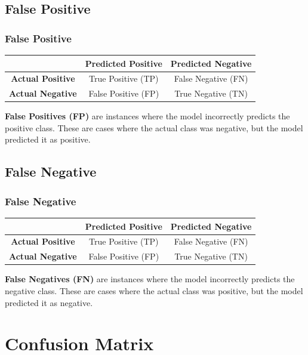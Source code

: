 \documentclass[aspectratio=169]{beamer} %
\begin{document}
	\subsection{False Positive}
	\begin{frame}
		\frametitle{False Positive}
		\begin{center}
			\begin{tabular}{|c|c|c|}
				\hline
				& \textbf{Predicted Positive} & \textbf{Predicted Negative} \\
				\hline
				\textbf{Actual Positive} & True Positive (TP) & False Negative (FN) \\
				\hline
				\textbf{Actual Negative} & {\color{blue}False Positive (FP)} & True Negative (TN) \\
				\hline
			\end{tabular}
		\end{center}

		{\bf False Positives (FP)} are instances where the model incorrectly predicts the positive class. These are cases where the actual class was negative, but the model predicted it as positive.
	\end{frame}

	\subsection{False Negative}
	\begin{frame}
		\frametitle{False Negative}
		\begin{center}
			\begin{tabular}{|c|c|c|}
				\hline
				& \textbf{Predicted Positive} & \textbf{Predicted Negative} \\
				\hline
				\textbf{Actual Positive} & True Positive (TP) & {\color{blue}False Negative (FN)} \\
				\hline
				\textbf{Actual Negative} & False Positive (FP) & True Negative (TN) \\
				\hline
			\end{tabular}
		\end{center}

		{\bf False Negatives (FN)} are instances where the model incorrectly predicts the negative class. These are cases where the actual class was positive, but the model predicted it as negative.
	\end{frame}

\section{Confusion Matrix}
\end{document}
